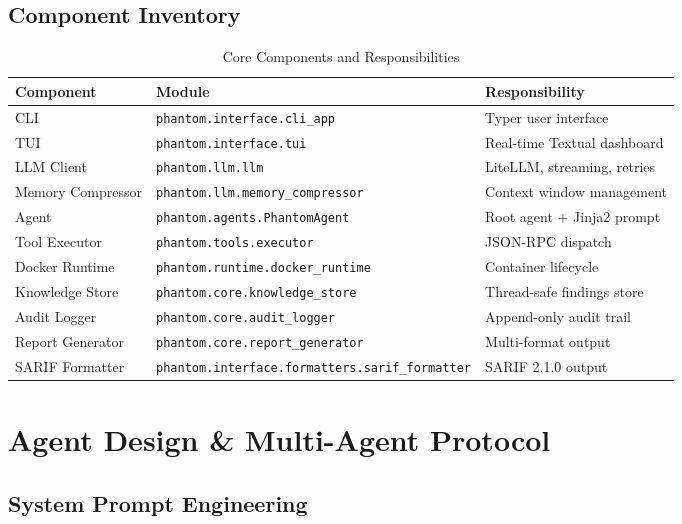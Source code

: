\documentclass[12pt,a4paper]{article}
\begin{document}
\subsection{Component Inventory}

\begin{table}[H]
\centering
\caption{Core Components and Responsibilities}
\begin{tabular}{lll}
\toprule
\textbf{Component} & \textbf{Module} & \textbf{Responsibility} \\
\midrule
CLI & \texttt{phantom.interface.cli\_app} & Typer user interface \\
TUI & \texttt{phantom.interface.tui} & Real-time Textual dashboard \\
LLM Client & \texttt{phantom.llm.llm} & LiteLLM, streaming, retries \\
Memory Compressor & \texttt{phantom.llm.memory\_compressor} & Context window management \\
Agent & \texttt{phantom.agents.PhantomAgent} & Root agent + Jinja2 prompt \\
Tool Executor & \texttt{phantom.tools.executor} & JSON-RPC dispatch \\
Docker Runtime & \texttt{phantom.runtime.docker\_runtime} & Container lifecycle \\
Knowledge Store & \texttt{phantom.core.knowledge\_store} & Thread-safe findings store \\
Audit Logger & \texttt{phantom.core.audit\_logger} & Append-only audit trail \\
Report Generator & \texttt{phantom.core.report\_generator} & Multi-format output \\
SARIF Formatter & \texttt{phantom.interface.formatters.sarif\_formatter} & SARIF 2.1.0 output \\
\bottomrule
\end{tabular}
\end{table}



\section{Agent Design \& Multi-Agent Protocol}

\subsection{System Prompt Engineering}
\end{document}
